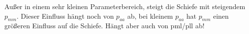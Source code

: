 


Außer in einem sehr kleinen Parameterbereich, steigt die Schiefe mit steigendem $p_{mm}$. Dieser Einfluss hängt noch von $p_{aa}$ ab, bei kleinem $p_{aa}$ hat $p_{mm}$ einen größeren Einfluss auf die Schiefe. Hängt aber auch von pml/pll ab! 

